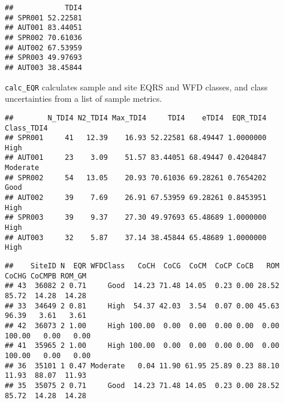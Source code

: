 \documentclass[]{article}
\newenvironment{Shaded}{\begin{snugshade}}{\end{snugshade}}
\newcommand{\DataTypeTok}[1]{\textcolor[rgb]{0.13,0.29,0.53}{#1}}
\newcommand{\DecValTok}[1]{\textcolor[rgb]{0.00,0.00,0.81}{#1}}
\newcommand{\KeywordTok}[1]{\textcolor[rgb]{0.13,0.29,0.53}{\textbf{#1}}}
\newcommand{\NormalTok}[1]{#1}
\newcommand{\OperatorTok}[1]{\textcolor[rgb]{0.81,0.36,0.00}{\textbf{#1}}}
\newcommand{\StringTok}[1]{\textcolor[rgb]{0.31,0.60,0.02}{#1}}
\begin{document}
\begin{verbatim}
##            TDI4
## SPR001 52.22581
## AUT001 83.44051
## SPR002 70.61036
## AUT002 67.53959
## SPR003 49.97693
## AUT003 38.45844
\end{verbatim}

\texttt{calc\_EQR} calculates sample and site EQRS and WFD classes, and
class uncertainties from a list of sample metrics.

\begin{Shaded}
\end{Shaded}

\begin{verbatim}
##        N_TDI4 N2_TDI4 Max_TDI4     TDI4    eTDI4  EQR_TDI4 Class_TDI4
## SPR001     41   12.39    16.93 52.22581 68.49447 1.0000000       High
## AUT001     23    3.09    51.57 83.44051 68.49447 0.4204847   Moderate
## SPR002     54   13.05    20.93 70.61036 69.28261 0.7654202       Good
## AUT002     39    7.69    26.91 67.53959 69.28261 0.8453951       High
## SPR003     39    9.37    27.30 49.97693 65.48689 1.0000000       High
## AUT003     32    5.87    37.14 38.45844 65.48689 1.0000000       High
\end{verbatim}

\begin{Shaded}
\end{Shaded}

\begin{verbatim}
##    SiteID N  EQR WFDClass   CoCH  CoCG  CoCM  CoCP CoCB   ROM  CoCHG CoCMPB ROM_GM
## 43  36082 2 0.71     Good  14.23 71.48 14.05  0.23 0.00 28.52  85.72  14.28  14.28
## 33  34649 2 0.81     High  54.37 42.03  3.54  0.07 0.00 45.63  96.39   3.61   3.61
## 42  36073 2 1.00     High 100.00  0.00  0.00  0.00 0.00  0.00 100.00   0.00   0.00
## 41  35965 2 1.00     High 100.00  0.00  0.00  0.00 0.00  0.00 100.00   0.00   0.00
## 36  35101 1 0.47 Moderate   0.04 11.90 61.95 25.89 0.23 88.10  11.93  88.07  11.93
## 35  35075 2 0.71     Good  14.23 71.48 14.05  0.23 0.00 28.52  85.72  14.28  14.28
\end{verbatim}
\end{document}
